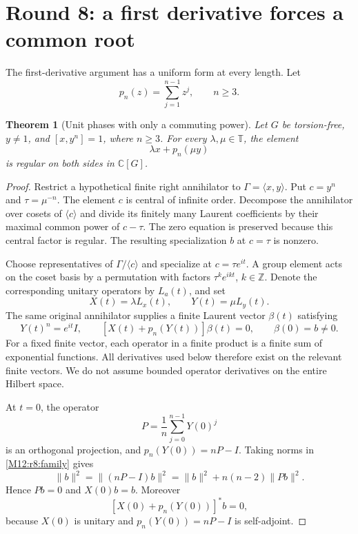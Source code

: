 \documentclass[11pt,a4paper,oneside]{report}
\newtheorem{theorem}{Theorem}[section]
\theoremstyle{definition}
\theoremstyle{remark}
\newcommand{\C}{\mathbb C}
\newcommand{\Z}{\mathbb Z}
\newcommand{\T}{\mathbb T}
\begin{document}
\section{Round 8: a first derivative forces a common root}
\label{M12:r8:section}

The first-derivative argument has a uniform form at every length.
Let
\[
 p_n(z)=\sum_{j=1}^{n-1}z^j,\qquad n\ge3.
\]

\begin{theorem}[Unit phases with only a commuting power]
\label{M12:r8:unit-phase}
Let $G$ be torsion-free, $y\ne1$, and $[x,y^n]=1$, where $n\ge3$.
For every $\lambda,\mu\in\T$, the element
\[
 \lambda x+p_n(\mu y)
\]
is regular on both sides in $\C[G]$.
\end{theorem}

\begin{proof}
Restrict a hypothetical finite right annihilator to
$\Gamma=\langle x,y\rangle$. Put $c=y^n$ and $\tau=\mu^{-n}$.
The element $c$ is central of infinite order. Decompose the annihilator
over cosets of $\langle c\rangle$ and divide its finitely many Laurent
coefficients by their maximal common power of $c-\tau$.
The zero equation is preserved because this central factor is regular.
The resulting specialization $b$ at $c=\tau$ is nonzero.

Choose representatives of $\Gamma/\langle c\rangle$ and specialize
at $c=\tau e^{it}$. A group element acts on the coset basis by a
permutation with factors $\tau^k e^{ikt}$, $k\in\Z$.
Denote the corresponding unitary operators by $L_a(t)$, and set
\[
 X(t)=\lambda L_x(t),\qquad Y(t)=\mu L_y(t).
\]
The same original annihilator supplies a finite Laurent vector
$\beta(t)$ satisfying
\begin{equation}\label{M12:r8:family}
 Y(t)^n=e^{it}I,\qquad
 [X(t)+p_n(Y(t))]\beta(t)=0,\qquad \beta(0)=b\ne0.
\end{equation}
For a fixed finite vector, each operator in a finite product is a
finite sum of exponential functions. All derivatives used below
therefore exist on the relevant finite vectors. We do not assume
bounded operator derivatives on the entire Hilbert space.

At $t=0$, the operator
\[
 P=\frac1n\sum_{j=0}^{n-1}Y(0)^j
\]
is an orthogonal projection, and $p_n(Y(0))=nP-I$.
Taking norms in \eqref{M12:r8:family} gives
\[
 \|b\|^2=\|(nP-I)b\|^2
 =\|b\|^2+n(n-2)\|Pb\|^2.
\]
Hence $Pb=0$ and $X(0)b=b$. Moreover
\begin{equation}\label{M12:r8:left-kernel}
 [X(0)+p_n(Y(0))]^*b=0,
\end{equation}
because $X(0)$ is unitary and $p_n(Y(0))=nP-I$ is self-adjoint.


\end{proof}
\end{document}
